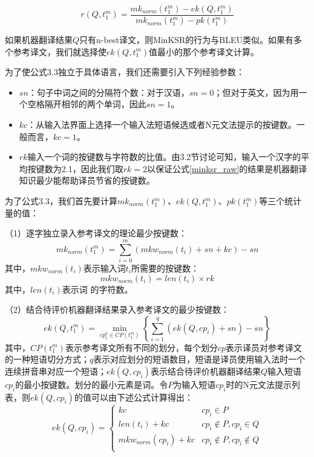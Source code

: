 \begin{equation}
\label{minksr_raw}
r(Q,t_1^m)=\frac{mk_{norm}(t_1^m)-ek(Q,t_1^m)}{mk_{norm}(t_1^m)-pk(t_1^m)}
\end{equation}

如果机器翻译结果$Q$只有n-best译文，则MinKSR的行为与BLEU类似。如果有多个参考译文，我们就选择使$ek(Q, t_1^m)$值最小的那个参考译文计算。

为了使公式3.3独立于具体语言，我们还需要引入下列经验参数：

\begin{itemize}
	\item $sn$：句子中词之间的分隔符个数：对于汉语，$sn=0$；但对于英文，因为用一个空格隔开相邻的两个单词，因此$sn=1$。
	
	\item $kc$：从输入法界面上选择一个输入法短语候选或者N元文法提示的按键数。一般而言，$kc=1$。
	
	\item $rk$输入一个词的按键数与字符数的比值。由3.2节讨论可知，输入一个汉字的平均按键数为2.1，因此我们取$rk=2$以保证公式\ref{minksr_raw}的结果是机器翻译知识最少能帮助译员节省的按键数。
\end{itemize}

为了公式3.3，我们首先要计算$mk_{norm}(t_1^m)$、$ek(Q, t_1^m)$、$pk(t_1^m)$等三个统计量的值：

（1）逐字独立录入参考译文的理论最少按键数：
\begin{equation}
mk_{norm}(t_1^m) = \sum_{i=0}^m (mkw_{norm} (t_i)+sn+kc)-sn
\end{equation}
其中，$mkw_{norm} (t_i)$表示输入词$t_i$所需要的按键数：
\begin{equation}
mkw_{norm} (t_i)=len(t_i) \times rk
\end{equation}
其中，$len(t_i)$表示词 的字符数。

（2）结合待评价机器翻译结果录入参考译文的最少按键数：
\begin{equation}
ek (Q,t_1^m) =\min_{cp_1^q \in CP(t_1^m)} \left\{ \sum_{i=1}^q {(ek(Q,cp_i)+sn)-sn} \right\}
\end{equation}
其中，$CP(t_1^m)$表示参考译文所有不同的划分，每个划分$cp$表示译员对参考译文的一种短语切分方式；$q$表示对应划分的短语数目，短语是译员使用输入法时一个连续拼音串对应一个短语；$ek(Q,cp_i)$表示结合待评价机器翻译结果$Q$输入短语$cp_i$的最小按键数。划分的最小元素是词。令$P$为输入短语$cp_i$时的N元文法提示列表，则$ek(Q,cp_i)$的值可以由下述公式计算得出：
\begin{equation}
\label{minksr_ek}
ek(Q,cp_i) = \left \{ 
\begin{array}{ll}
kc & cp_i \in P \\
len(t_i)+kc & cp_i \notin P,cp_i \in Q \\
mkw_{norm}(cp_i)+kc & cp_i\notin P,cp_i \notin Q \\
\end{array}
\right. 
\end{equation}

